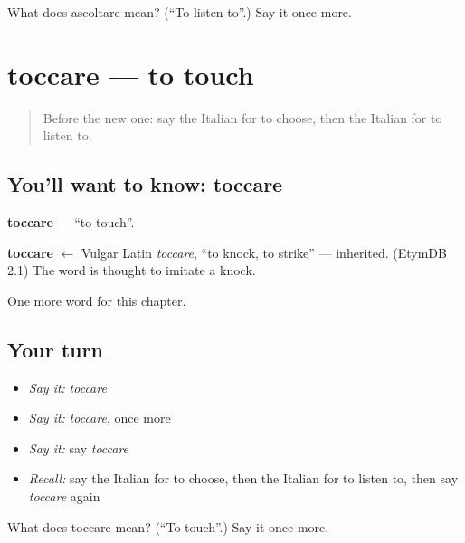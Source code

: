 \begin{tcolorbox}[breakable,colback=teal!4,colframe=teal!35!black,title={Before you move on}]
What does ascoltare mean? (\textquotedblleft{}To listen to\textquotedblright{}.) Say it once more.
\end{tcolorbox}
\section[toccare]{toccare — to touch}

\label{lesson:IT-C176-toccare}



\begin{quote}
Before the new one: say the Italian for to choose, then the Italian for to listen to.
\end{quote}

\subsection*{You'll want to know: toccare}
\textbf{toccare} — \textquotedblleft{}to touch\textquotedblright{}.

\begin{cousinweb}
\textbf{toccare} $\leftarrow$ Vulgar Latin \emph{toccare}, \textquotedblleft{}to knock, to strike\textquotedblright{} — inherited. (EtymDB 2.1) The word is thought to imitate a knock.
\end{cousinweb}

\begin{grammarlens}[title={What you've built}]
One more word for this chapter.
\end{grammarlens}

\subsection*{Your turn}
\begin{itemize}
\raggedright
  \item \emph{Say it:} \emph{toccare}
  \item \emph{Say it:} \emph{toccare}, once more
  \item \emph{Say it:} say \emph{toccare}
  \item \emph{Recall:} say the Italian for to choose, then the Italian for to listen to, then say \emph{toccare} again
\end{itemize}

\begin{tcolorbox}[breakable,colback=teal!4,colframe=teal!35!black,title={Before you move on}]
What does toccare mean? (\textquotedblleft{}To touch\textquotedblright{}.) Say it once more.
\end{tcolorbox}
